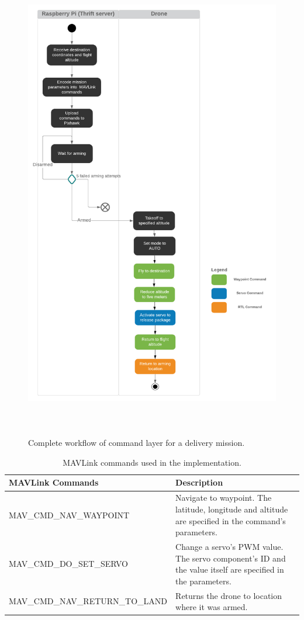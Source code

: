 \begin{figure}[t]
	\includegraphics[width=\textwidth, height=21cm]{figures/Ch3/MAVlink_swimlane.png}
	\caption{Complete workflow of command layer for a delivery mission.}
	\label{fig:commandworkflow}
\end{figure}
\FloatBarrier

\begin{table}[t]
 \caption{MAVLink commands used in the implementation.}
 \linespread{0.7}\selectfont
 \begin{center}
     \begin{tabular}{|p{7cm}|p{8cm}|} 
     \hline
     \textbf{MAVLink Commands} & \textbf{Description}\\ 
     \hline
     MAV\_CMD\_NAV\_WAYPOINT & Navigate to waypoint. The latitude, longitude and altitude are specified in the command's parameters.\\
     \hline
     MAV\_CMD\_DO\_SET\_SERVO & Change a servo's PWM value. The servo component's ID and the value itself are specified in the parameters.\\
     \hline
     MAV\_CMD\_NAV\_RETURN\_TO\_LAND & Returns the drone to location where it was armed.\\
     \hline
     \end{tabular}
  \end{center}
 \label{table:mavlinkcmds}
\end{table}
\FloatBarrier

